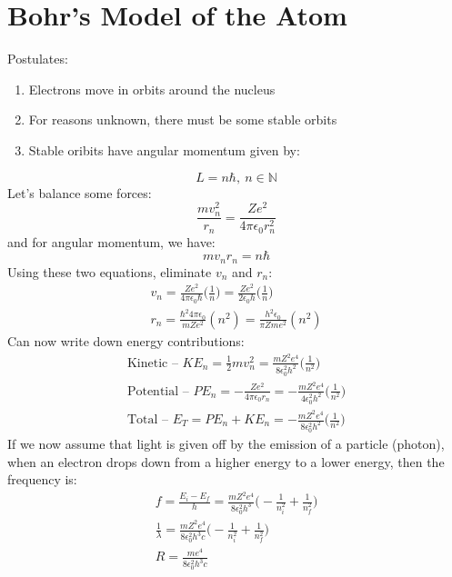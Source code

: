 \documentclass[a4paper, 11pt, fleqn, normalem]{report}
\begin{document}
\section{Bohr's Model of the Atom}
Postulates:
\begin{enumerate}
    \item Electrons move in orbits around the nucleus
    \item For reasons unknown, there must be some stable orbits
    \item Stable oribits have angular momentum given by:
\end{enumerate}
\begin{equation*}
    L = n\hbar,~n \in \mathbb{N}
\end{equation*}
Let's balance some forces:
\begin{equation*}
    \frac{mv_{n}^{2}}{r_{n}} = \frac{Ze^{2}}{4\pi\epsilon_{0}r_{n}^{2}}
\end{equation*}
and for angular momentum, we have:
\begin{equation*}
    mv_{n}r_{n} = n\hbar
\end{equation*}
Using these two equations, eliminate $v_{n}$ and $r_{n}$:
\begin{gather*}
    v_{n} = \frac{Ze^{2}}{4\pi\epsilon_{0}\hbar}\Big(\frac{1}{n}\Big) = \frac{Ze^{2}}{2\epsilon_{0}h}\Big(\frac{1}{n}\Big) \\
    r_{n} = \frac{\hbar^{2}4\pi\epsilon_{0}}{mZe^{2}}(n^{2}) = \frac{h^{2}\epsilon_{0}}{\pi Zme^{2}}(n^{2})
\end{gather*}
Can now write down energy contributions:
\begin{gather*}
    \text{Kinetic -- }KE_{n} = \frac{1}{2}mv_{n}^{2} = \frac{mZ^{2}e^{4}}{8\epsilon_{0}^{2}h^{2}}\Big(\frac{1}{n^{2}}\Big) \\
    \text{Potential -- }PE_{n} = -\frac{Ze^{2}}{4\pi\epsilon_{0}r_{n}} = -\frac{mZ^{2}e^{4}}{4\epsilon_{0}^{2}h^{2}}\Big(\frac{1}{n^{2}}\Big) \\
    \text{Total -- }E_{T} = PE_{n} + KE_{n} = -\frac{mZ^{2}e^{4}}{8\epsilon_{0}^{2}h^{2}}\Big(\frac{1}{n^{2}}\Big)
\end{gather*}
If we now assume that light is given off by the emission of a particle (photon), when an electron drops down from a higher energy to a lower energy, then the frequency is:
\begin{gather*}
    f = \frac{E_{i} - E_{f}}{h} = \frac{mZ^{2}e^{4}}{8\epsilon_{0}^{2}h^{3}}\Big(-\frac{1}{n_{i}^{2}} + \frac{1}{n_{f}^{2}}\Big) \\
    \frac{1}{\lambda} = \frac{mZ^{2}e^{4}}{8\epsilon_{0}^{2}h^{3}c}\Big(-\frac{1}{n_{i}^{2}} + \frac{1}{n_{f}^{2}}\Big) \\
    R = \frac{me^{4}}{8\epsilon_{0}^{2}h^{3}c}
\end{gather*}
\end{document}
